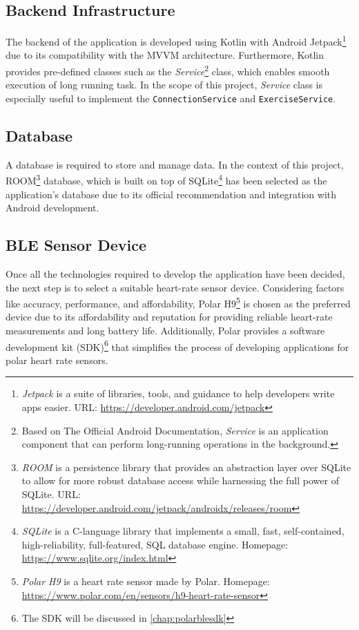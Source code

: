 \subsection{Backend Infrastructure}
The backend of the application is developed using Kotlin with Android Jetpack\footnote{\emph{Jetpack} is a suite of libraries, tools, and guidance to help developers write apps easier. URL: \url{https://developer.android.com/jetpack}} due to its compatibility with the MVVM architecture. 
Furthermore, Kotlin provides pre-defined classes such as the \emph{Service}\footnote{Based on The Official Android Documentation, \emph{Service} is an application component that can perform long-running operations in the background.\autocite{android-services}} class, which enables smooth execution of long running task. In the scope of this project, \emph{Service} class is especially useful to implement the \texttt{ConnectionService} and \texttt{ExerciseService}.

\subsection{Database}
A database is required to store and manage data. In the context of this project, ROOM\footnote{\emph{ROOM} is a persistence library that provides an abstraction layer over SQLite to allow for more robust database access while harnessing the full power of SQLite. URL: \url{https://developer.android.com/jetpack/androidx/releases/room}} database, which is built on top of SQLite\footnote{\emph{SQLite} is a C-language library that implements a small, fast, self-contained, high-reliability, full-featured, SQL database engine. Homepage: \url{https://www.sqlite.org/index.html}} has been selected as the application's database due to its official recommendation and integration with Android development.

\subsection{BLE Sensor Device}
Once all the technologies required to develop the application have been decided, the next step is to select a suitable heart-rate sensor device. Considering factors like accuracy, performance, and affordability, Polar H9\footnote{\emph{Polar H9} is a heart rate sensor made by Polar. Homepage: \url{https://www.polar.com/en/sensors/h9-heart-rate-sensor}} is chosen as the preferred device due to its affordability and reputation for providing reliable heart-rate measurements and long battery life. Additionally, Polar provides a software development kit (SDK)\footnote{The SDK will be discussed in \autoref{chap:polarblesdk}} that simplifies the process of developing applications for polar heart rate sensors.